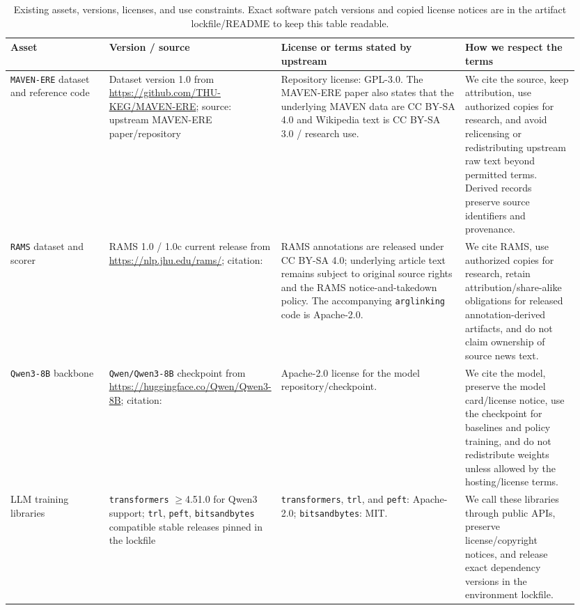 \documentclass{article}
\begin{document}
\begin{table}[ht]
\centering
\caption{Existing assets, versions, licenses, and use constraints. Exact software patch versions and copied license notices are in the artifact lockfile/README to keep this table readable.}
\label{tab:asset_licenses}
\small
\setlength{\tabcolsep}{3pt}
\begin{adjustbox}{max width=\linewidth}
\begin{tabular}{p{0.19\linewidth}p{0.20\linewidth}p{0.35\linewidth}p{0.21\linewidth}}
\hline
Asset & Version / source & License or terms stated by upstream & How we respect the terms \\
\hline
\texttt{MAVEN-ERE} dataset and reference code & Dataset version 1.0 from \url{https://github.com/THU-KEG/MAVEN-ERE}; source: upstream MAVEN-ERE paper/repository & Repository license: GPL-3.0. The MAVEN-ERE paper also states that the underlying MAVEN data are CC BY-SA 4.0 and Wikipedia text is CC BY-SA 3.0 / research use. & We cite the source, keep attribution, use authorized copies for research, and avoid relicensing or redistributing upstream raw text beyond permitted terms. Derived records preserve source identifiers and provenance. \\
\texttt{RAMS} dataset and scorer & RAMS 1.0 / 1.0c current release from \url{https://nlp.jhu.edu/rams/}; citation: \citet{ebner_multi-sentence_2020} & RAMS annotations are released under CC BY-SA 4.0; underlying article text remains subject to original source rights and the RAMS notice-and-takedown policy. The accompanying \texttt{arglinking} code is Apache-2.0. & We cite RAMS, use authorized copies for research, retain attribution/share-alike obligations for released annotation-derived artifacts, and do not claim ownership of source news text. \\
\texttt{Qwen3-8B} backbone & \texttt{Qwen/Qwen3-8B} checkpoint from \url{https://huggingface.co/Qwen/Qwen3-8B}; citation: \citet{yang_qwen3_2025} & Apache-2.0 license for the model repository/checkpoint. & We cite the model, preserve the model card/license notice, use the checkpoint for baselines and policy training, and do not redistribute weights unless allowed by the hosting/license terms. \\
LLM training libraries & \texttt{transformers} $\geq$4.51.0 for Qwen3 support; \texttt{trl}, \texttt{peft}, \texttt{bitsandbytes} compatible stable releases pinned in the lockfile & \texttt{transformers}, \texttt{trl}, and \texttt{peft}: Apache-2.0; \texttt{bitsandbytes}: MIT. & We call these libraries through public APIs, preserve license/copyright notices, and release exact dependency versions in the environment lockfile. \\

\end{tabular}
\end{adjustbox}
\end{table}
\end{document}
